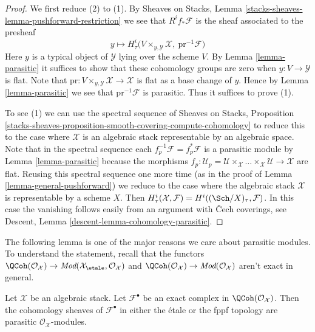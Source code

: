 \begin{proof}
We first reduce (2) to (1).
By Sheaves on Stacks, Lemma \ref{stacks-sheaves-lemma-pushforward-restriction}
we see that $R^if_*\mathcal{F}$ is the sheaf associated to the presheaf
$$
y \longmapsto
H^i_\tau\Big(V \times_{y, \mathcal{Y}} \mathcal{X},
\ \text{pr}^{-1}\mathcal{F}\Big)
$$
Here $y$ is a typical object of $\mathcal{Y}$ lying over the scheme $V$.
By Lemma \ref{lemma-parasitic} it suffices to show that
these cohomology groups are zero when $y : V \to \mathcal{Y}$ is flat.
Note that $\text{pr} : V \times_{y, \mathcal{Y}} \mathcal{X} \to \mathcal{X}$
is flat as a base change of $y$. Hence by
Lemma \ref{lemma-parasitic} we see that $\text{pr}^{-1}\mathcal{F}$
is parasitic. Thus it suffices to prove (1).

\medskip\noindent
To see (1) we can use the spectral sequence of
Sheaves on Stacks, Proposition
\ref{stacks-sheaves-proposition-smooth-covering-compute-cohomology}
to reduce this to the case where $\mathcal{X}$
is an algebraic stack representable by an algebraic space.
Note that in the spectral sequence each
$f_p^{-1}\mathcal{F} = f_p^*\mathcal{F}$ is a parasitic module by
Lemma \ref{lemma-parasitic} because the morphisms
$f_p : \mathcal{U}_p =
\mathcal{U} \times_\mathcal{X} \ldots
\times_\mathcal{X} \mathcal{U} \to \mathcal{X}$ are flat.
Reusing this spectral sequence one more time (as in the
proof of Lemma \ref{lemma-general-pushforward})
we reduce to the case where the
algebraic stack $\mathcal{X}$ is representable by a scheme $X$.
Then $H^i_\tau(\mathcal{X}, \mathcal{F}) = H^i((\Sch/X)_\tau, \mathcal{F})$.
In this case the vanishing follows easily from an argument
with {\v C}ech coverings, see
Descent, Lemma \ref{descent-lemma-cohomology-parasitic}.
\end{proof}

\noindent
The following lemma is one of the major reasons we care about
parasitic modules. To understand the statement, recall that
the functors
$\QCoh(\mathcal{O}_\mathcal{X}) \to
\textit{Mod}(\mathcal{X}_\etale, \mathcal{O}_\mathcal{X})$
and
$\QCoh(\mathcal{O}_\mathcal{X}) \to
\textit{Mod}(\mathcal{O}_\mathcal{X})$
aren't exact in general.

\begin{lemma}
\label{lemma-exact-sequence-quasi-coherent-parasitic-cohomology}
Let $\mathcal{X}$ be an algebraic stack. Let
$\mathcal{F}^\bullet$ be an
exact complex in $\QCoh(\mathcal{O}_\mathcal{X})$.
Then the cohomology sheaves of $\mathcal{F}^\bullet$
in either the \'etale or the fppf topology
are parasitic $\mathcal{O}_\mathcal{X}$-modules.
\end{lemma}

